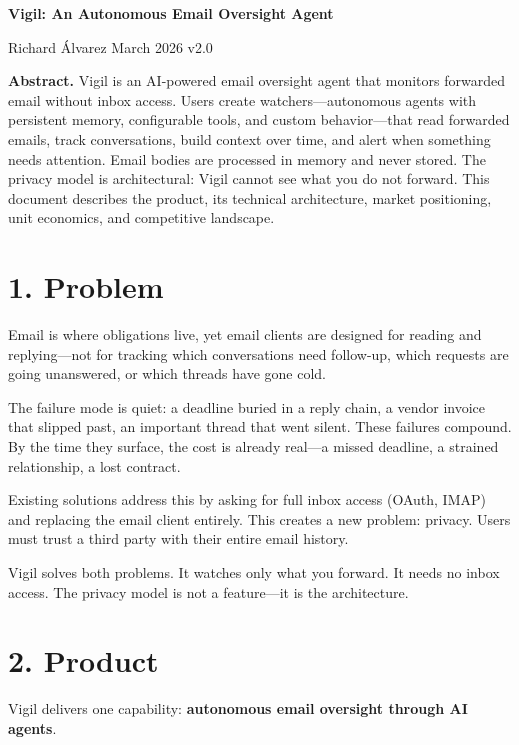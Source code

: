 \documentclass[10pt]{article}
\begin{document}
{\bfseries\Large Vigil: An Autonomous Email Oversight Agent}

\medskip
{\small Richard \'Alvarez \hfill March 2026 \hfill v2.0}

\bigskip

\textbf{Abstract.}
Vigil is an AI-powered email oversight agent that monitors forwarded email without inbox access.
Users create watchers---autonomous agents with persistent memory, configurable tools, and custom behavior---that
read forwarded emails, track conversations, build context over time, and alert when something needs attention.
Email bodies are processed in memory and never stored. The privacy model is architectural: Vigil cannot see
what you do not forward. This document describes the product, its technical architecture, market positioning,
unit economics, and competitive landscape.

\bigskip

\section*{1. Problem}

Email is where obligations live, yet email clients are designed for reading and replying---not for tracking
which conversations need follow-up, which requests are going unanswered, or which threads have gone cold.

The failure mode is quiet: a deadline buried in a reply chain, a vendor invoice that slipped past, an important
thread that went silent. These failures compound. By the time they surface, the cost is already real---a missed
deadline, a strained relationship, a lost contract.

Existing solutions address this by asking for full inbox access (OAuth, IMAP) and replacing the email client entirely.
This creates a new problem: privacy. Users must trust a third party with their entire email history.

Vigil solves both problems. It watches only what you forward. It needs no inbox access. The privacy model is not a
feature---it is the architecture.

\section*{2. Product}

Vigil delivers one capability: \textbf{autonomous email oversight through AI agents}.
\end{document}
